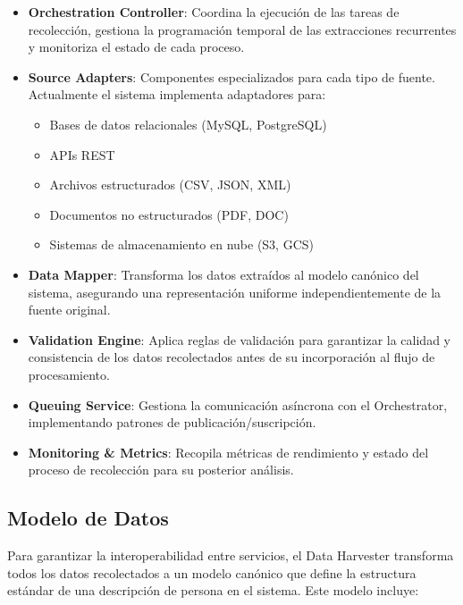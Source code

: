 \documentclass[12pt,a4paper]{article}
\begin{document}
\begin{itemize}
    \item \textbf{Orchestration Controller}: Coordina la ejecución de las tareas de recolección, gestiona la programación temporal de las extracciones recurrentes y monitoriza el estado de cada proceso.
    
    \item \textbf{Source Adapters}: Componentes especializados para cada tipo de fuente. Actualmente el sistema implementa adaptadores para:
    \begin{itemize}
        \item Bases de datos relacionales (MySQL, PostgreSQL)
        \item APIs REST
        \item Archivos estructurados (CSV, JSON, XML)
        \item Documentos no estructurados (PDF, DOC)
        \item Sistemas de almacenamiento en nube (S3, GCS)
    \end{itemize}
    
    \item \textbf{Data Mapper}: Transforma los datos extraídos al modelo canónico del sistema, asegurando una representación uniforme independientemente de la fuente original.
    
    \item \textbf{Validation Engine}: Aplica reglas de validación para garantizar la calidad y consistencia de los datos recolectados antes de su incorporación al flujo de procesamiento.
    
    \item \textbf{Queuing Service}: Gestiona la comunicación asíncrona con el Orchestrator, implementando patrones de publicación/suscripción.
    
    \item \textbf{Monitoring & Metrics}: Recopila métricas de rendimiento y estado del proceso de recolección para su posterior análisis.
\end{itemize}

\subsection{Modelo de Datos}
\label{subsec:dh-modelo-datos}

Para garantizar la interoperabilidad entre servicios, el Data Harvester transforma todos los datos recolectados a un modelo canónico que define la estructura estándar de una descripción de persona en el sistema. Este modelo incluye:
\end{document}
